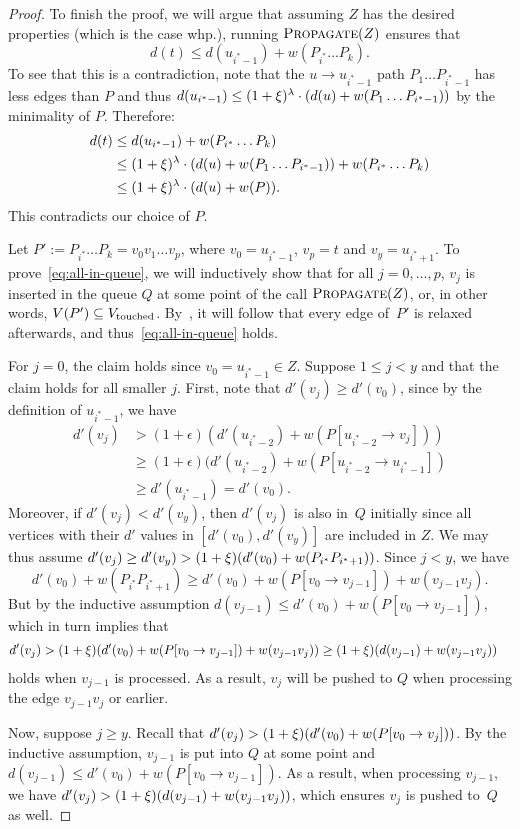 \documentclass[11pt,letterpaper]{article}
\theoremstyle{plain}
\newcommand{\eps}{\ensuremath{\epsilon}}
\newcommand{\wei}{w}
\DeclareMathOperator*{\PD}{\textsc{Propagate}}
\begin{document}
\begin{proof}
  To finish the proof, we will argue that assuming $Z$ has the desired properties (which is the case whp.),
  running $\PD(Z)$ ensures that
  \begin{equation}\label{eq:all-in-queue}
    d(t)\leq d(u_{i^*-1})+\wei(P_{i^*}\ldots P_k).
  \end{equation}
  To see that this is a contradiction, note that the $u\to u_{i^*-1}$ path $P_1\ldots P_{i^*-1}$ has less edges than
  $P$ and thus $d(u_{i^*-1})\leq (1+\epsp)^\bal\cdot (d(u)+\wei(P_1\ldots P_{i^*-1}))$
  by the minimality of $P$. Therefore:
  \begin{align*}
    d(t)&\leq d(u_{i^*-1})+\wei(P_{i^*}\ldots P_k)\\
    &\leq (1+\epsp)^\bal\cdot (d(u)+\wei(P_1\ldots P_{i^*-1}))+\wei(P_{i^*}\ldots P_k)\\
    &\leq (1+\epsp)^\bal \cdot (d(u)+\wei(P)).
  \end{align*}
  This contradicts our choice of $P$.

  Let $P':=P_{i^*}\ldots P_k=v_0v_1\ldots v_p$, where $v_0=u_{i^*-1}$, $v_p=t$ and $v_{y}=u_{i^*+1}$.
  To prove~\eqref{eq:all-in-queue}, 
  we will inductively show that for all $j=0,\ldots,p$, $v_j$ is inserted in the queue $Q$ at some point of the call $\PD(Z)$, or, in other words, $V(P')\subseteq V_{\mathrm{touched}}$.
  By~, it will follow
  that every edge of~$P'$ is relaxed afterwards, and thus~\eqref{eq:all-in-queue} holds.
  
  For $j=0$, the claim holds since $v_0=u_{i^*-1}\in Z$. Suppose $1\leq j<y$ and that the claim holds for all smaller $j$.
 First, note that $d'(v_j)\geq d'(v_0)$, since by the definition of $u_{i^*-1}$, we have
\begin{align*}
  d'(v_j)&>(1+\eps)(d'(u_{i^*-2})+\wei(P[u_{i^*-2}\to v_j]))\\
  &\geq (1+\eps)(d'(u_{i^*-2})+\wei(P[u_{i^*-2}\to u_{i^*-1}])\\
  &\geq d'(u_{i^*-1})
  =d'(v_0).
\end{align*}
 Moreover, if $d'(v_j)<d'(v_y)$, then $d'(v_j)$ is also in~$Q$ initially since all vertices with their $d'$ values in $[d'(v_0),d'(v_y)]$ are included in $Z$.
 We may thus assume $d'(v_j)\geq d'(v_y)>(1+\epsp)(d'(v_0)+\wei(P_{i^*}P_{i^*+1}))$.
 Since $j<y$, we have \[d'(v_0)+w(P_{i^*}P_{i^*+1})\geq d'(v_0)+w(P[v_0\to v_{j-1}])+\wei(v_{j-1}v_j).\]
 But by the inductive assumption $d(v_{j-1})\leq d'(v_0)+\wei(P[v_0\to v_{j-1}])$, which in turn implies that
\begin{align*}
  d'(v_j)&>(1+\epsp)(d'(v_0)+\wei(P[v_0\to v_{j-1}])+\wei(v_{j-1}v_j))\geq (1+\epsp)(d(v_{j-1})+\wei(v_{j-1}v_j))
\end{align*}
holds when $v_{j-1}$ is processed.
 As a result, $v_j$ will be pushed to $Q$ when processing the edge $v_{j-1}v_j$ or earlier.

 Now, suppose $j\geq y$. Recall that $d'(v_j)>(1+\epsp)(d'(v_0)+\wei(P[v_0\to v_j]))$. By the inductive assumption, $v_{j-1}$ is
 put into $Q$ at some point and $d(v_{j-1})\leq d'(v_0)+\wei(P[v_0\to v_{j-1}])$.
 As a result, when processing $v_{j-1}$, we have $d'(v_j)>(1+\epsp)(d(v_{j-1})+\wei(v_{j-1}v_j))$, which ensures
 $v_j$ is pushed to~$Q$ as well.
\end{proof}

\clearpage


\end{document}
